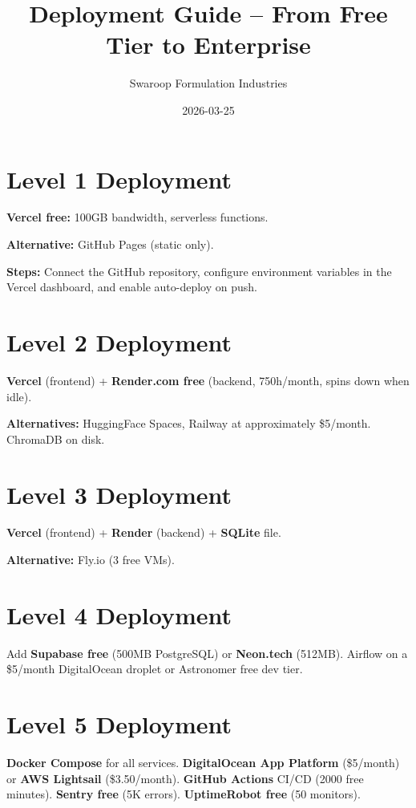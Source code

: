 \documentclass{article}
\title{Deployment Guide -- From Free Tier to Enterprise}
\author{Swaroop Formulation Industries}
\date{2026-03-25}
\begin{document}
\maketitle

\section{Level 1 Deployment}

\textbf{Vercel free:} 100GB bandwidth, serverless functions.

\textbf{Alternative:} GitHub Pages (static only).

\textbf{Steps:} Connect the GitHub repository, configure environment variables in the Vercel dashboard, and enable auto-deploy on push.

\section{Level 2 Deployment}

\textbf{Vercel} (frontend) + \textbf{Render.com free} (backend, 750h/month, spins down when idle).

\textbf{Alternatives:} HuggingFace Spaces, Railway at approximately \$5/month. ChromaDB on disk.

\section{Level 3 Deployment}

\textbf{Vercel} (frontend) + \textbf{Render} (backend) + \textbf{SQLite} file.

\textbf{Alternative:} Fly.io (3 free VMs).

\section{Level 4 Deployment}

Add \textbf{Supabase free} (500MB PostgreSQL) or \textbf{Neon.tech} (512MB). Airflow on a \$5/month DigitalOcean droplet or Astronomer free dev tier.

\section{Level 5 Deployment}

\textbf{Docker Compose} for all services. \textbf{DigitalOcean App Platform} (\$5/month) or \textbf{AWS Lightsail} (\$3.50/month). \textbf{GitHub Actions} CI/CD (2000 free minutes). \textbf{Sentry free} (5K errors). \textbf{UptimeRobot free} (50 monitors).
\end{document}
